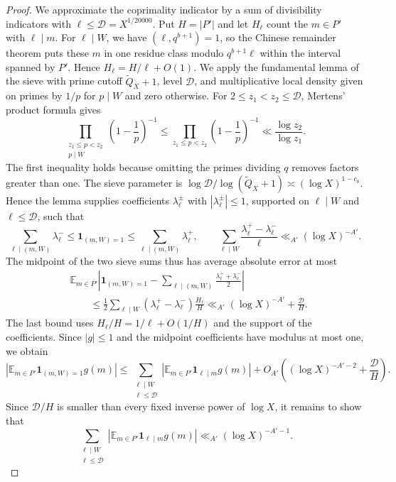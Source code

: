 \documentclass[12pt]{amsart}
\newcommand{\1}{\mathbf 1}
\theoremstyle{definition}
\begin{document}
\begin{proof}
We approximate the coprimality indicator by a sum of divisibility
indicators with $\ell\leq\mathcal D=X^{1/20000}$. Put $H=|P'|$
and let $H_\ell$ count the $m\in P'$ with $\ell\mid m$. For
$\ell\mid W$, we have $(\ell,q^{b+1})=1$, so the Chinese
remainder theorem puts these $m$ in one residue class modulo
$q^{b+1}\ell$ within the interval spanned by $P'$.  Hence $H_\ell=H/\ell+O(1)$. We apply the fundamental lemma of the sieve
\cite[Lemma~6.3]{IwaniecKowalski} with prime cutoff
$\widetilde Q_X+1$, level $\mathcal D$, and multiplicative local
density given on primes by $1/p$ for $p\mid W$ and zero otherwise.
For \(2\leq z_1<z_2\leq \mathcal D\), Mertens' product
formula gives
\[
 \prod_{\substack{z_1\leq p<z_2\\p\mid W}}
       \left(1-\frac1p\right)^{-1}
 \leq
 \prod_{z_1\leq p<z_2}\left(1-\frac1p\right)^{-1}
 \ll \frac{\log z_2}{\log z_1}.
\]
The first inequality holds because omitting the primes dividing
\(q\) removes factors greater than one.  The sieve parameter is
\(\log\mathcal D/\log(\widetilde Q_X+1)
\asymp(\log X)^{1-c_0}\). Hence the lemma supplies coefficients
\(\lambda_\ell^\pm\) with \(|\lambda_\ell^\pm|\leq1\), supported
on \(\ell\mid W\) and \(\ell\leq\mathcal D\), such that
\[
 \sum_{\ell\mid(m,W)}\lambda_\ell^-
 \leq\mathbf1_{(m,W)=1}
 \leq\sum_{\ell\mid(m,W)}\lambda_\ell^+,
 \qquad
 \sum_{\ell\mid W}\frac{\lambda_\ell^+-\lambda_\ell^-}{\ell}
 \ll_{A'}(\log X)^{-A'}.
\]
The midpoint of the two sieve sums thus has average absolute
error at most
\[
\begin{aligned}
 &\mathbb E_{m\in P'}
 \left|\mathbf1_{(m,W)=1}
       -\sum_{\ell\mid(m,W)}
         \frac{\lambda_\ell^++\lambda_\ell^-}{2}\right|\\
 &\qquad\leq
 \frac12\sum_{\ell\mid W}
    (\lambda_\ell^+-\lambda_\ell^-)\frac{H_\ell}{H}
 \ll_{A'}(\log X)^{-A'}+\frac{\mathcal D}{H}.
\end{aligned}
\]
The last bound uses $H_\ell/H=1/\ell+O(1/H)$ and the support
of the coefficients. Since $|g|\leq1$ and the midpoint
coefficients have modulus at most one, we obtain
\[
 \left|\mathbb E_{m\in P'}\mathbf1_{(m,W)=1}g(m)\right|
 \leq
 \sum_{\substack{\ell\mid W\\\ell\leq\mathcal D}}
 \left|\mathbb E_{m\in P'}\mathbf1_{\ell\mid m}g(m)\right|
 +O_{A'}\!\left((\log X)^{-A'-2}+\frac{\mathcal D}{H}\right).
\]
Since $\mathcal D/H$ is smaller than every fixed inverse power
of $\log X$,  it remains to show that
\[
 \sum_{\substack{\ell\mid W\\\ell\leq\mathcal D}}
 \left|\mathbb E_{m\in P'}\mathbf1_{\ell\mid m}g(m)\right|
 \ll_{A'}(\log X)^{-A'-1}.
\]


\end{proof}
\end{document}

